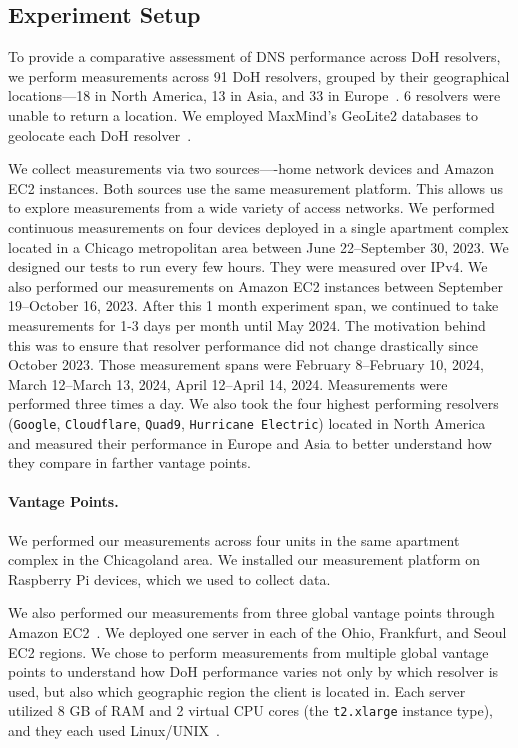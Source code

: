 \subsection{Experiment Setup}
To provide a comparative assessment of DNS
performance across DoH resolvers, we perform measurements across 91 DoH
resolvers, grouped by their geographical locations—18 in North America, 13 in
Asia, and 33 in Europe~\cite{dnscrypt}. 6 resolvers were unable to return a location. 
We employed MaxMind's GeoLite2 databases to geolocate each DoH resolver~\cite{maxmind}.

We collect measurements via two sources—-home network devices and Amazon EC2 instances. 
Both sources use the same measurement platform. This allows us to explore measurements from a wide variety
of access networks. We performed continuous measurements on four devices deployed in a single apartment complex located in a 
Chicago metropolitan area between June 22--September 30, 2023. We designed our tests to run every few hours. They were measured over IPv4. We also performed our measurements on Amazon EC2 instances between September 19--October 16, 2023. 
After this 1 month experiment span, we continued to take measurements for 1-3 days per month until May 2024. 
The motivation behind this was to ensure that resolver performance did not change drastically since October 2023. 
Those measurement spans were February 8--February 10, 2024, 
March 12--March 13, 2024, April 12--April 14, 2024. Measurements were performed three times a day. 
We also took the four highest performing resolvers (\texttt{Google}, \texttt{Cloudflare}, \texttt{Quad9},
\texttt{Hurricane Electric}) located in North America and measured their
performance in Europe and Asia to better understand how they compare in
farther vantage points. 

\paragraph{Vantage Points.} 
We performed our measurements across four units in the same apartment complex in the Chicagoland area. 
We installed our measurement platform on Raspberry Pi devices, which we used to 
collect data. 

We also performed our measurements from three global
vantage points through Amazon EC2~\cite{amazon_ec2}.  We deployed one server
in each of the Ohio, Frankfurt, and Seoul EC2 regions.  We chose to perform
measurements from multiple global vantage points to understand how DoH
performance varies not only by which resolver is used, but also which
geographic region the client is located in.  Each server utilized 8 GB of RAM
and 2 virtual CPU cores (the \texttt{t2.xlarge} instance type), and they each
used Linux/UNIX~\cite{amazon_ec2_instance_types}.

